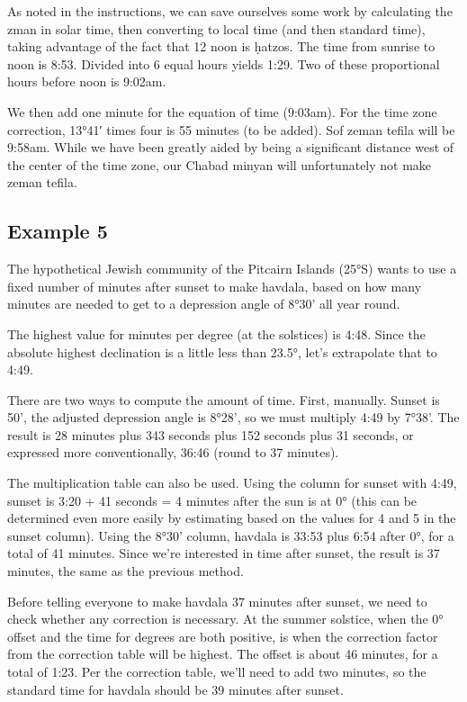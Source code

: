 As noted in the instructions, we can save ourselves some work by calculating the zman in solar time, then converting to local time (and then standard time), taking advantage of the fact that 12 noon is \d{h}atzos.  The time from sunrise to noon is 8:53.  Divided into 6 equal hours yields 1:29.  Two of these proportional hours before noon is 9:02am.

We then add one minute for the equation of time (9:03am).  For the time zone correction, 13°41′ times four is 55 minutes (to be added).  Sof zeman tefila will be 9:58am.  While we have been greatly aided by being a significant distance west of the center of the time zone, our Chabad minyan will unfortunately not make zeman tefila.

\subsection{Example 5}

The hypothetical Jewish community of the Pitcairn Islands (25°S) wants to use a fixed number of minutes after sunset to make havdala, based on how many minutes are needed to get to a depression angle of 8°30' all year round.

The highest value for minutes per degree (at the solstices) is 4:48. Since the absolute highest declination is a little less than 23.5°, let's extrapolate that to 4:49.  

There are two ways to compute the amount of time. First, manually.  Sunset is 50', the adjusted depression angle is 8°28', so we must multiply 4:49 by 7°38'. The result is 28 minutes plus 343 seconds plus 152 seconds plus 31 seconds, or expressed more conventionally, 36:46 (round to 37 minutes).

The multiplication table can also be used.  Using the column for sunset with 4:49, sunset is 3:20 + 41 seconds = 4 minutes after the sun is at 0° (this can be determined even more easily by estimating based on the values for 4 and 5 in the sunset column). Using the 8°30' column, havdala is 33:53 plus 6:54 after 0°, for a total of 41 minutes. Since we're interested in time after sunset, the result is 37 minutes, the same as the previous method.

Before telling everyone to make havdala 37 minutes after sunset, we need to check whether any correction is necessary.  At the summer solstice, when the 0° offset and the time for degrees are both positive, is when the correction factor from the correction table will be highest.  The offset is about 46 minutes, for a total of 1:23. Per the correction table, we'll need to add two minutes, so the standard time for havdala should be 39 minutes after sunset.